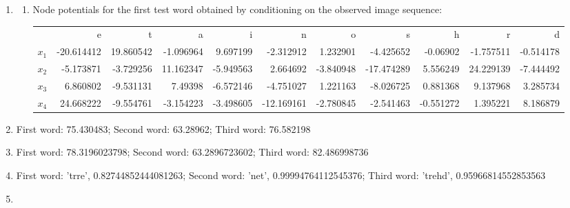 \documentclass[12pt]{article}
\begin{document}
\begin{enumerate}

\item %
\begin{enumerate}
\item %
Node potentials for the first test word obtained by conditioning on the observed image sequence:
\begin{center}
\begin{tabular}{rrrrrrrrrrr}
 & e & t & a & i & n & o & s & h & r & d \\
$x_1$ & -20.614412 & 19.860542 & -1.096964 & 9.697199 & -2.312912 & 1.232901 & -4.425652 & -0.06902 & -1.757511 & -0.514178 \\
$x_2$ & -5.173871 & -3.729256 & 11.162347 & -5.949563 & 2.664692 & -3.840948 & -17.474289 & 5.556249 & 24.229139 & -7.444492 \\
$x_3$ & 6.860802 & -9.531131 & 7.49398 & -6.572146 & -4.751027 & 1.221163 & -8.026725 & 0.881368 & 9.137968 & 3.285734 \\
$x_4$ & 24.668222 & -9.554761 & -3.154223 & -3.498605 & -12.169161 & -2.780845 & -2.541463 & -0.551272 & 1.395221 & 8.186879
\end{tabular}
\end{center}
\end{enumerate}

\item %
First word: 75.430483; Second word: 63.28962; Third word: 76.582198

\item %
First word: 78.3196023798; Second word: 63.2896723602; Third word: 82.486998736

\item %
First word: 'trre', 0.82744852444081263; Second word: 'net', 0.99994764112545376; Third word: 'trehd', 0.95966814552853563

\item %


\end{enumerate}
\end{document}
